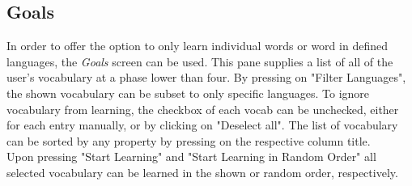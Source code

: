         \subsection{Goals} \label{goals}
        In order to offer the option to only learn individual words or word in defined languages, the \textit{Goals} screen can be used. This pane supplies a list of all of the user's vocabulary at a phase lower than four. By pressing on "Filter Languages", the shown vocabulary can be subset to only specific languages. To ignore vocabulary from learning, the checkbox of each vocab can be unchecked, either for each entry manually, or by clicking on "Deselect all". The list of vocabulary can be sorted by any property by pressing on the respective column title. \\
        Upon pressing "Start Learning" and "Start Learning in Random Order" all selected vocabulary can be learned in the shown or random order, respectively.